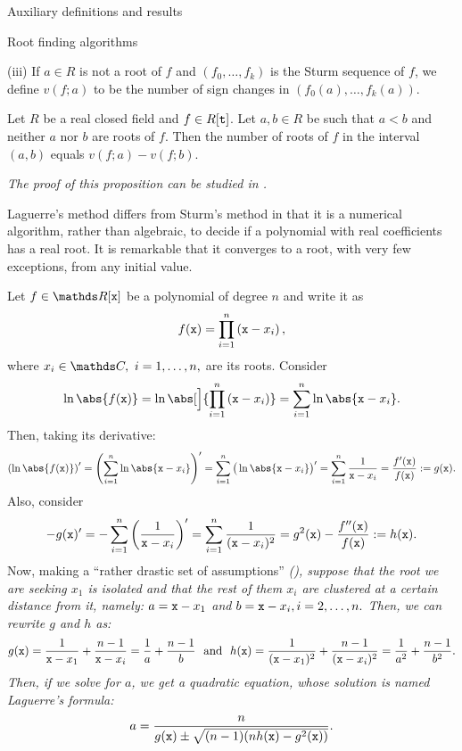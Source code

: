 \documentclass[11pt, a4paper, english, twoside, notitlepage, openright]{report}
\begin{document}
\begin{chapter}{Auxiliary definitions and results}
\begin{section}{Root finding algorithms}
\begin{definitions}
(iii) If $a\in R$ is not a root of $f$ and $(f_0,\dots,f_k)$ is the Sturm sequence of $f$, we define $v(f;a)$ to be the number of sign changes in $(f_0(a),\dots,f_k(a))$.
\end{definitions}
\begin{proposition}\label{sturm} 
Let $R$ be a real closed field and $f\in R[{\tt t}]$. Let $a,b\in R$ be such that $a<b$ and neither $a$ nor $b$ are roots of $f$. Then the number of roots of $f$ in the interval $(a,b)$ equals $v(f;a)-v(f;b)$.

\em The proof of this proposition can be studied in \cite[1.2.10]{bcr}. \em
\end{proposition}

Laguerre's method differs from Sturm's method in that it is a numerical algorithm, rather than algebraic, to decide if a polynomial with real coefficients has a real root. It is remarkable that it converges to a root, with very few exceptions, from any initial value.

\begin{proposition}\label{laguerre}
Let $f\in\R[{\tt x}]$ be a polynomial of degree $n$ and write it as
\begin{equation*}\label{eq:lagPol}
f({\tt x})=\prod_{i=1}^n \left({\tt x}-x_i\right),
\end{equation*}
where $x_i\in\C,\ i=1,\dots, n,$ are its roots. Consider
$$
\ln \abs{f({\tt x})}=\ln\abs[\Big]{\prod_{i=1}^n \left({\tt x}-x_i\right)} = \sum_{i=1}^n \ln\abs{\x - x_i}.
$$
Then, taking its derivative:
$$
\left(\ln \abs{f({\tt x})}\right)'=\left(\sum_{i=1}^n \ln\abs{\x - x_i}\right)'=\sum_{i=1}^n \big(\ln\abs{\x - x_i}\big)' = \sum_{i=1}^n \frac{1}{\x - x_i} = \frac{f'(\x)}{f(\x)}:= g(\x).
$$
Also, consider
$$
-g({\tt x})'= -\sum_{i=1}^n \left(\frac{1}{{\tt x} - x_i}\right)' = \sum_{i=1}^n \frac{1}{({\tt x} - x_i)^2} =g^2({\tt x})-\frac{f''({\tt x})}{f({\tt x})}:= h({\tt x}).
$$
Now, making a ``rather drastic set of assumptions'' \em(\cite[page 187]{a})\em, suppose that the root we are seeking $x_1$ is isolated and that the rest of them $x_i$ are clustered at a certain distance from it, namely: $a = {\tt x} - x_1$ and $b = {\tt x} -x_i, i=2,\dots, n.$ Then, we can rewrite $g$ and $h$ as: 
$$
g({\tt x})=\frac{1}{{\tt x}-x_1}+\frac{n-1}{{\tt x}-x_i} = \frac{1}{a}+\frac{n-1}{b} \ \text{ and } \ h({\tt x})=\frac{1}{({\tt x}-x_1)^2}+\frac{n-1}{({\tt x}-x_i)^2} = \frac{1}{a^2}+\frac{n-1}{b^2}.
$$
Then, if we solve for $a$, we get a quadratic equation, whose solution is named \em Laguerre's formula\em:
\begin{equation}\label{eq:lagEq}
a=\frac{n}{g({\tt x})\pm\sqrt{(n-1)(nh({\tt x})-g^2({\tt x}))}}.
\end{equation}


\end{proposition}
\end{section}
\end{chapter}
\end{document}
